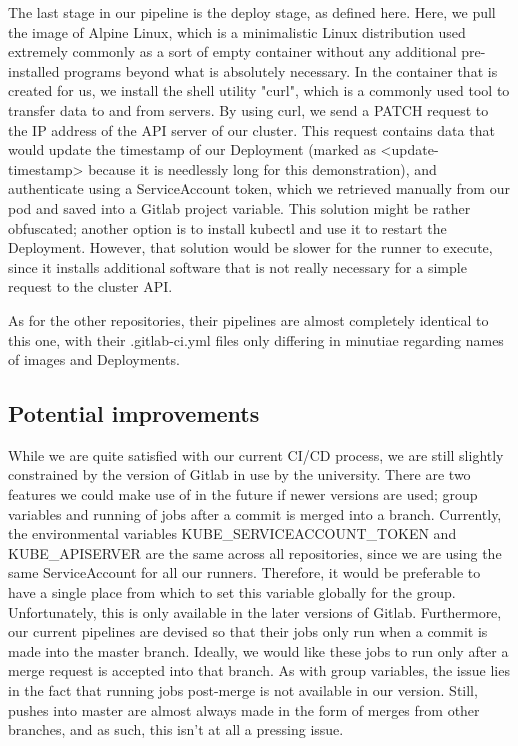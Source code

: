 \documentclass[thesis=B,english]{FITthesis}[2019/12/23]
\begin{document}
The last stage in our pipeline is the deploy stage, as defined here. Here, we pull the image of Alpine Linux, which is a minimalistic Linux distribution used extremely commonly as a sort of empty container without any additional pre-installed programs beyond what is absolutely necessary. In the container that is created for us, we install the shell utility "curl", which is a commonly used tool to transfer data to and from servers. By using curl, we send a PATCH request to the IP address of the API server of our cluster. This request contains data that would update the timestamp of our Deployment (marked as <update-timestamp> because it is needlessly long for this demonstration), and authenticate using a ServiceAccount token, which we retrieved manually from our pod and saved into a Gitlab project variable. This solution might be rather obfuscated; another option is to install kubectl and use it to restart the Deployment. However, that solution would be slower for the runner to execute, since it installs additional software that is not really necessary for a simple request to the cluster API.

As for the other repositories, their pipelines are almost completely identical to this one, with their .gitlab-ci.yml files only differing in minutiae regarding names of images and Deployments. 

\subsection{Potential improvements}

While we are quite satisfied with our current CI/CD process, we are still slightly constrained by the version of Gitlab in use by the university. There are two features we could make use of in the future if newer versions are used; group variables and running of jobs after a commit is merged into a branch. Currently, the environmental variables KUBE\_SERVICEACCOUNT\_TOKEN and KUBE\_APISERVER are the same across all repositories, since we are using the same ServiceAccount for all our runners. Therefore, it would be preferable to have a single place from which to set this variable globally for the group. Unfortunately, this is only available in the later versions of Gitlab. Furthermore, our current pipelines are devised so that their jobs only run when a commit is made into the master branch. Ideally, we would like these jobs to run only after a merge request is accepted into that branch. As with group variables, the issue lies in the fact that running jobs post-merge is not available in our version. Still, pushes into master are almost always made in the form of merges from other branches, and as such, this isn't at all a pressing issue.
\end{document}
